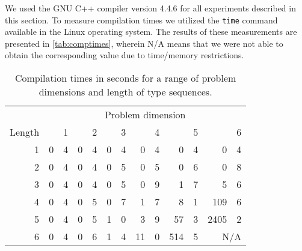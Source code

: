 \documentclass[10pt,a4paper]{article}
\theoremstyle{definition}\newtheorem{problem}{Problem}
\begin{document}
We used the GNU C++ compiler version 4.4.6 for all experiments described in this section. To measure compilation times we utilized the \texttt{time} command available in the Linux operating system. The results of these measurements are presented in \autoref{tab:comptimes}, wherein N/A means that we were not able to obtain the corresponding value due to time/memory restrictions.
\renewcommand{\arraystretch}{1.00}
\renewcommand{\tabcolsep}{3mm}
\begin{table}[t]
\caption{Compilation times in seconds for a range of problem dimensions and length of type sequences.} \begin{center}
\begin{tabular}{r*{6}{r@{.}l}}
\toprule
 & \multicolumn{12}{c}{Problem dimension } \\ \cmidrule(l){2-13}
Length  & \multicolumn{2}{r}{1} & \multicolumn{2}{r}{2} & \multicolumn{2}{r}{3} & \multicolumn{2}{r}{4} & \multicolumn{2}{r}{5} & \multicolumn{2}{r}{6} \\ \cmidrule(r){1-1} \cmidrule(l){2-13}
1 & 0 & 4 & 0 & 4 & 0 & 4 & 0 & 4 & 0 & 4 & 0 & 4 \\
2 & 0 & 4 & 0 & 4 & 0 & 5 & 0 & 5 & 0 & 6 & 0 & 8 \\
3 & 0 & 4 & 0 & 4 & 0 & 5 & 0 & 9 & 1 & 7 & 5 & 6 \\
4 & 0 & 4 & 0 & 5 & 0 & 7 & 1 & 7 & 8 & 1 & 109 & 6 \\
5 & 0 & 4 & 0 & 5 & 1 & 0 & 3 & 9 & 57 & 3 & 2405 & 2 \\
6 & 0 & 4 & 0 & 6 & 1 & 4 & 11 & 0 & 514 & 5 & \multicolumn{2}{r}{N/A} \\
\bottomrule
\end{tabular}
\end{center}
\label{tab:comptimes}
\end{table}
\end{document}
